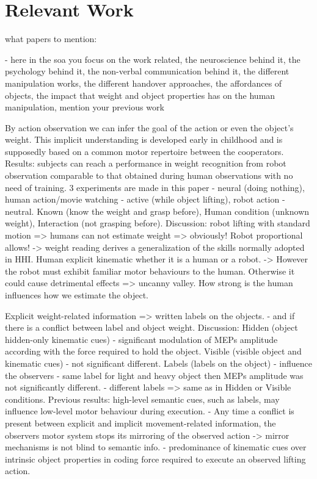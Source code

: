 \section{Relevant Work}

what papers to mention:

- here in the soa you focus on the work related, the neuroscience behind it, the psychology behind it, the non-verbal communication behind it, the different manipulation works, the different handover approaches, the affordances of objects, the impact that weight and object properties has on the human manipulation, mention your previous work

 \cite{sciutti_understanding_2014}
By action observation we can infer the goal of the action or even the object's weight. This implicit understanding is developed early in childhood and is supposedly based on a common motor repertoire between the cooperators. Results: subjects can reach a performance in weight recognition from robot observation comparable to that obtained during human observations with no need of training. 3 experiments are made in this paper - neural (doing nothing), human action/movie watching - active (while object lifting), robot action - neutral. Known (know the weight and grasp before), Human condition (unknown weight), Interaction (not grasping before). 
Discussion: robot lifting with standard motion => humans can not estimate weight => obviously! Robot proportional allows! -> weight reading derives a generalization of the skills normally adopted in HHI. Human explicit kinematic whether it is a human or a robot. -> However the robot must exhibit familiar motor behaviours to the human. Otherwise it could cause detrimental effects => uncanny valley. How strong is the human influences how we estimate the object. 
 
 \cite{senot_effect_2011}
Explicit weight-related information => written labels on the objects. - and if there is a conflict between label and object weight. 
Discussion: Hidden (object hidden-only kinematic cues) - significant modulation of MEPs amplitude according with the force required to hold the object. Visible (visible object and kinematic cues) - not significant different. Labels (labels on the object) - influence the observers - same label for light and heavy object then MEPs amplitude was not significantly different. - different labels => same as in Hidden or Visible conditions. 
Previous results: high-level semantic cues, such as labels, may influence low-level motor behaviour during execution. - Any time a conflict is present between explicit and implicit movement-related information, the observers motor system stops its mirroring of the observed action -> mirror mechanisms is not blind to semantic info. - predominance of kinematic cues over intrinsic object properties in coding force required to execute an observed lifting action. 

